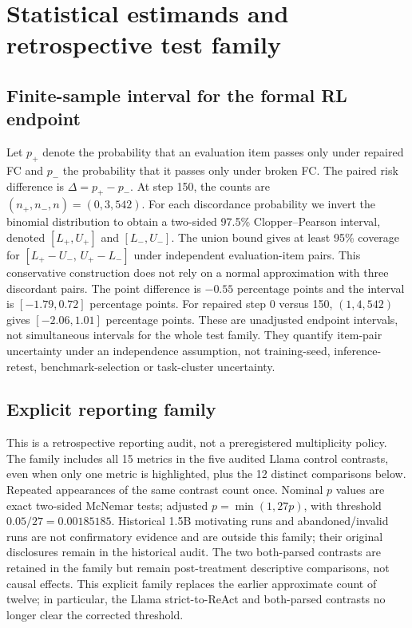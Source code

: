 \section{Statistical estimands and retrospective test family}
\label{app:statistics}

\subsection{Finite-sample interval for the formal RL endpoint}
Let $p_+$ denote the probability that an evaluation item passes only under repaired FC and
$p_-$ the probability that it passes only under broken FC. The paired risk difference is
$\Delta=p_+-p_-$. At step 150, the counts are $(n_+,n_-,n)=(0,3,542)$.
For each discordance probability we invert the binomial distribution to obtain a two-sided
97.5\% Clopper--Pearson interval, denoted $[L_+,U_+]$ and $[L_-,U_-]$.
The union bound gives at least 95\% coverage for
$[L_+-U_-,\,U_+-L_-]$ under independent evaluation-item pairs. This conservative construction
does not rely on a normal approximation with three discordant pairs. The point difference is
$-0.55$ percentage points and the interval is $[-1.79,0.72]$ percentage points.
For repaired step 0 versus 150, $(1,4,542)$ gives $[-2.06,1.01]$ percentage points.
These are unadjusted endpoint intervals, not simultaneous intervals for the whole test family.
They quantify item-pair uncertainty under an independence assumption, not training-seed,
inference-retest, benchmark-selection or task-cluster uncertainty.

\subsection{Explicit reporting family}
This is a retrospective reporting audit, not a preregistered multiplicity policy.
The family includes all 15 metrics in the five audited Llama control contrasts, even when only
one metric is highlighted, plus the 12 distinct comparisons below. Repeated appearances of the
same contrast count once. Nominal $p$ values are exact two-sided McNemar tests;
adjusted $p=\min(1,27p)$, with threshold $0.05/27=0.00185185$.
Historical 1.5B motivating runs and abandoned/invalid runs are not confirmatory evidence and
are outside this family; their original disclosures remain in the historical audit.
The two both-parsed contrasts are retained in the family but remain post-treatment descriptive
comparisons, not causal effects. This explicit family replaces the earlier approximate count of
twelve; in particular, the Llama strict-to-ReAct and both-parsed contrasts no longer clear
the corrected threshold.

